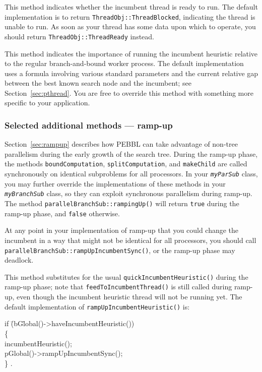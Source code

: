 This method indicates
whether the incumbent thread is ready to run.  The default
implementation is to return \texttt{ThreadObj::ThreadBlocked},
indicating the thread is unable to run.  As soon as your thread has
some data upon which to operate, you should return
\texttt{ThreadObj::ThreadReady} instead.  

This method indicates the importance of running the incumbent
heuristic relative to the regular branch-and-bound worker process. The
default implementation uses a formula involving various standard parameters and
the current relative gap between the best known search node and the
incumbent; see Section~\ref{sec:pthread}.  You are free to override
this method with something more specific to your application.



\subsubsection{Selected additional methods --- ramp-up}
Section~\ref{sec:rampup} describes how PEBBL can take advantage of
non-tree parallelism during the early growth of the search tree.
During the ramp-up phase, the methods \texttt{boundComputation},
\texttt{splitComputation}, and \texttt{makeChild} are called
synchronously on identical subproblems for all processors.  In your
\texttt{\emph{myParSub}} class, you may further override the
implementations of these methods in your \texttt{\emph{myBranchSub}}
class, so they can exploit synchronous parallelism during ramp-up.
The method \texttt{parallelBranchSub::rampingUp()} will return
\texttt{true} during the ramp-up phase, and \texttt{false} otherwise.

At any point in your implementation of ramp-up that you could change
the incumbent in a way that might not be identical for all processors,
you should call
\texttt{parallelBranchSub::\linebreak[0]rampUpIncumbentSync()}, or the
ramp-up phase may deadlock.

This method substitutes for the usual
\texttt{quickIncumbentHeuristic()} during the ramp-up phase; note that
\texttt{feedToIncumbentThread()} is still called during ramp-up, even
though the incumbent heuristic thread will not be running yet.  The
default implementation of \texttt{rampUpIncumbentHeuristic()} is:
\begin{codeblock}
      if \=(bG\=lobal()->haveIncumbentHeuristic()) \\
\>	\{ \\
\>\>	  incumbentHeuristic(); \\
\>\>	  pGlobal()->rampUpIncumbentSync();\\
\>      \} \textrm{.}
\end{codeblock}


